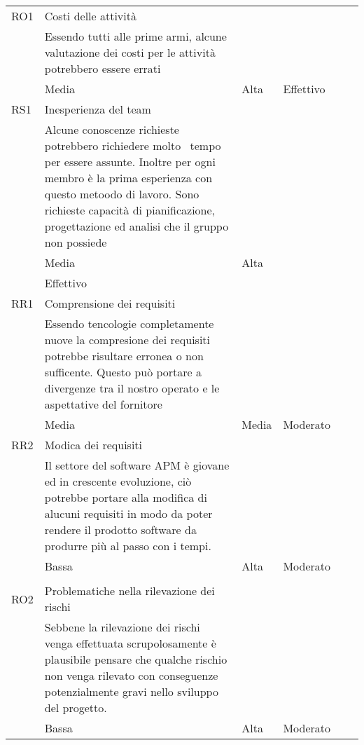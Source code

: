 \begin{table}
\begin{tabular}{p{}p{}p{}p{}p{}p{}}
		RO1    & Costi delle attività\\                       & Essendo tutti alle prime armi, alcune valutazione dei costi per le attività potrebbero essere errati\\                                                                                                                                                          & Media         & Alta    & Effettivo      \\
		RS1    & Inesperienza del team\\                      & Alcune conoscenze richieste potrebbero richiedere molto~ tempo per essere assunte. Inoltre per ogni membro è la prima esperienza con questo metoodo di lavoro. Sono richieste capacità di pianificazione, progettazione ed analisi che il gruppo non possiede\\ & Media         & Alta\\  & Effettivo      \\
		RR1    & Comprensione dei requisiti\\                 & Essendo tencologie completamente nuove la compresione dei requisiti potrebbe risultare erronea o non sufficente. Questo può portare a divergenze tra il nostro operato e le aspettative del fornitore\\                                                         & Media         & Media   & Moderato       \\
		RR2    & Modica dei requisiti\\                       & Il settore del software APM è giovane ed in crescente evoluzione, ciò potrebbe portare alla modifica di alucuni requisiti in modo da poter rendere il prodotto software da produrre più al passo con i tempi.\\                                                 & Bassa         & Alta    & Moderato\\     \\
		RO2    & Problematiche nella rilevazione dei rischi\\ & Sebbene la rilevazione dei rischi venga effettuata scrupolosamente è plausibile pensare che qualche rischio non venga rilevato con conseguenze potenzialmente gravi nello sviluppo del progetto.\\                                                              & Bassa         & Alta    & Moderato       \\ \bottomrule
	\end{tabular}
\end{table}

